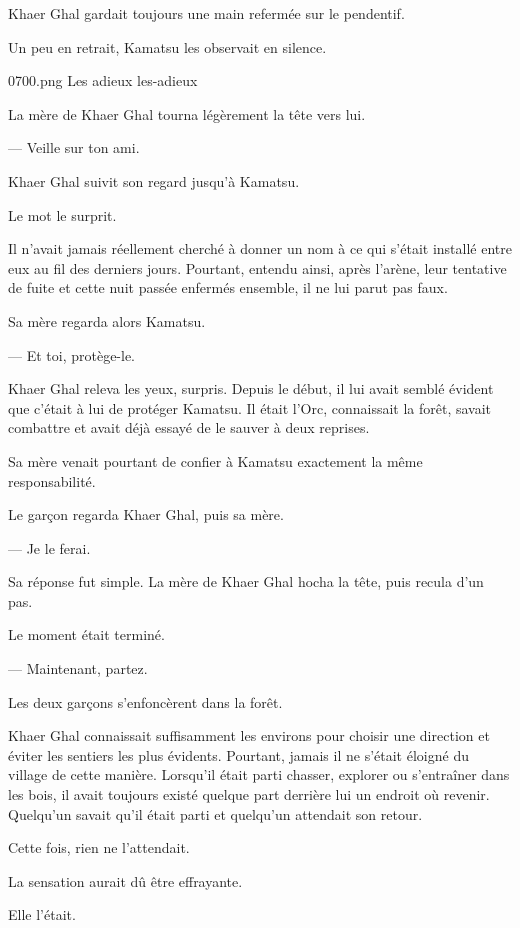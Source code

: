Khaer Ghal gardait toujours une main refermée sur le pendentif.

Un peu en retrait, Kamatsu les observait en silence.

\illustration
  {0700.png}
  {Les adieux}
  {les-adieux}

La mère de Khaer Ghal tourna légèrement la tête vers lui.

— Veille sur ton ami.

Khaer Ghal suivit son regard jusqu'à Kamatsu.

Le mot le surprit.

Il n'avait jamais réellement cherché à donner un nom à ce qui s'était installé
entre eux au fil des derniers jours. Pourtant, entendu ainsi, après l'arène,
leur tentative de fuite et cette nuit passée enfermés ensemble, il ne lui parut
pas faux.

Sa mère regarda alors Kamatsu.

— Et toi, protège-le.

Khaer Ghal releva les yeux, surpris. Depuis le début, il lui avait semblé
évident que c'était à lui de protéger Kamatsu. Il était l'Orc, connaissait la
forêt, savait combattre et avait déjà essayé de le sauver à deux reprises.

Sa mère venait pourtant de confier à Kamatsu exactement la même responsabilité.

Le garçon regarda Khaer Ghal, puis sa mère.

— Je le ferai.

Sa réponse fut simple. La mère de Khaer Ghal hocha la tête, puis recula d'un
pas.

Le moment était terminé.

— Maintenant, partez.

\scenebreak

Les deux garçons s'enfoncèrent dans la forêt.

Khaer Ghal connaissait suffisamment les environs pour choisir une direction et
éviter les sentiers les plus évidents. Pourtant, jamais il ne s'était éloigné
du village de cette manière. Lorsqu'il était parti chasser, explorer ou
s'entraîner dans les bois, il avait toujours existé quelque part derrière lui
un endroit où revenir. Quelqu'un savait qu'il était parti et quelqu'un
attendait son retour.

Cette fois, rien ne l'attendait.

La sensation aurait dû être effrayante.

Elle l'était.

